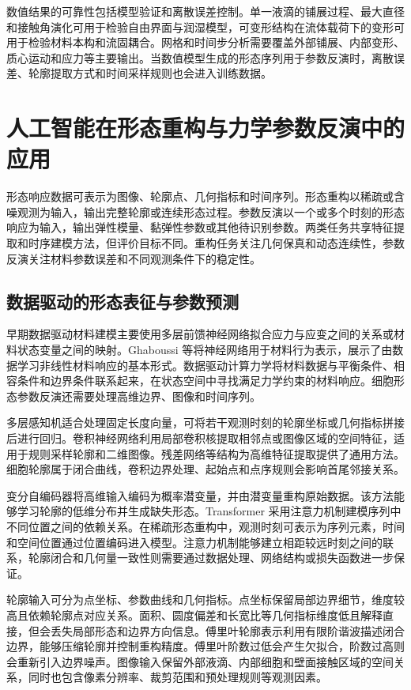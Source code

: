 数值结果的可靠性包括模型验证和离散误差控制。单一液滴的铺展过程、最大直径和接触角演化可用于检验自由界面与润湿模型，可变形结构在流体载荷下的变形可用于检验材料本构和流固耦合。网格和时间步分析需要覆盖外部铺展、内部变形、质心运动和应力等主要输出\cite{roache1998verification}。当数值模型生成的形态序列用于参数反演时，离散误差、轮廓提取方式和时间采样规则也会进入训练数据。

\section{人工智能在形态重构与力学参数反演中的应用}

形态响应数据可表示为图像、轮廓点、几何指标和时间序列。形态重构以稀疏或含噪观测为输入，输出完整轮廓或连续形态过程。参数反演以一个或多个时刻的形态响应为输入，输出弹性模量、黏弹性参数或其他待识别参数。两类任务共享特征提取和时序建模方法，但评价目标不同。重构任务关注几何保真和动态连续性，参数反演关注材料参数误差和不同观测条件下的稳定性。

\subsection{数据驱动的形态表征与参数预测}

早期数据驱动材料建模主要使用多层前馈神经网络拟合应力与应变之间的关系或材料状态变量之间的映射。Ghaboussi 等将神经网络用于材料行为表示，展示了由数据学习非线性材料响应的基本形式\cite{ghaboussi1991materialnn}。数据驱动计算力学将材料数据与平衡条件、相容条件和边界条件联系起来，在状态空间中寻找满足力学约束的材料响应\cite{kirchdoerfer2016datadriven}。细胞形态参数反演还需要处理高维边界、图像和时间序列。

多层感知机适合处理固定长度向量，可将若干观测时刻的轮廓坐标或几何指标拼接后进行回归。卷积神经网络利用局部卷积核提取相邻点或图像区域的空间特征，适用于规则采样轮廓和二维图像。残差网络等结构为高维特征提取提供了通用方法\cite{lecun2015deeplearning,krizhevsky2012imagenet,he2016resnet}。细胞轮廓属于闭合曲线，卷积边界处理、起始点和点序规则会影响首尾邻接关系。

变分自编码器将高维输入编码为概率潜变量，并由潜变量重构原始数据\cite{kingma2014vae}。该方法能够学习轮廓的低维分布并生成缺失形态。Transformer 采用注意力机制建模序列中不同位置之间的依赖关系\cite{vaswani2017attention}。在稀疏形态重构中，观测时刻可表示为序列元素，时间和空间位置通过位置编码进入模型。注意力机制能够建立相距较远时刻之间的联系，轮廓闭合和几何量一致性则需要通过数据处理、网络结构或损失函数进一步保证。

轮廓输入可分为点坐标、参数曲线和几何指标。点坐标保留局部边界细节，维度较高且依赖轮廓点对应关系。面积、圆度偏差和长宽比等几何指标维度低且解释直接，但会丢失局部形态和边界方向信息。傅里叶轮廓表示利用有限阶谐波描述闭合边界，能够压缩轮廓并控制重构精度\cite{kuhl1982elliptic}。傅里叶阶数过低会产生欠拟合，阶数过高则会重新引入边界噪声。图像输入保留外部液滴、内部细胞和壁面接触区域的空间关系，同时也包含像素分辨率、裁剪范围和预处理规则等观测因素。

